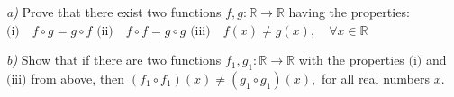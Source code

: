 \textit{a)} Prove that there exist two functions $ f,g:\mathbb{R}\longrightarrow\mathbb{R} $ having the properties:
$ \text{(i)}\quad f\circ g=g\circ f $
$\text{(ii)}\quad f\circ f=g\circ g $
$ \text{(iii)}\quad f(x)\neq g(x), \quad \forall x\in\mathbb{R} $

\textit{b)} Show that if there are two functions $  f_1,g_1:\mathbb{R}\longrightarrow\mathbb{R} $ with the properties $ \text{(i)} $ and $ \text{(iii)} $ from above, then $ \left( f_1\circ f_1\right)(x) \neq \left( g_1\circ g_1 \right)(x) , $ for all real numbers $ x. $